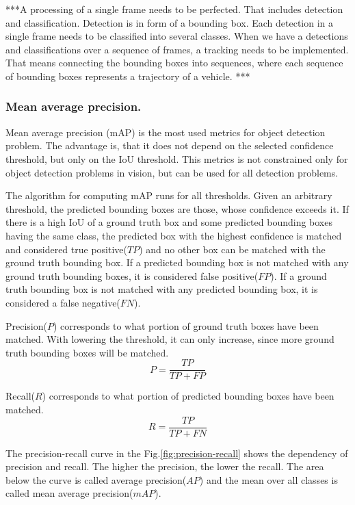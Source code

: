 \documentclass[a4paper,12pt,titlepage, twoside]{article}
\numberwithin{figure}{section}
\begin{document}
***A processing of a single frame needs to be perfected. That includes detection and classification. Detection is in form of a bounding box. Each detection in a single frame needs to be classified into several classes. When we have a detections and classifications over a sequence of frames, a tracking needs to be implemented. That means connecting the bounding boxes into sequences, where each sequence of bounding boxes represents a trajectory of a vehicle. ***



\subsubsection{Mean average precision.}
\label{sec:mAP}
Mean average precision (mAP) is the most used metrics for object detection problem. The advantage is, that it does not depend on the selected confidence threshold, but only on the IoU threshold. This metrics is not constrained only for object detection problems in vision, but can be used for all detection problems. 

The algorithm for computing mAP runs for all thresholds. Given an arbitrary threshold, the predicted bounding boxes are those, whose confidence exceeds it. If there is a high IoU of a ground truth box and some predicted bounding boxes having the same class, the predicted box with the highest confidence is matched and considered true positive($TP$) and no other box can be matched with the ground truth bounding box. If a predicted bounding box is not matched with any ground truth bounding boxes, it is considered false positive($FP$). If a ground truth bounding box is not matched with any predicted bounding box, it is considered a false negative($FN$).

Precision($P$) corresponds to what portion of ground truth boxes have been matched. With lowering the threshold, it can only increase, since more ground truth bounding boxes will be matched.
\begin{equation}
P = \frac{TP}{TP + FP}
\end{equation}

Recall($R$) corresponds to what portion of predicted bounding boxes have been matched. 
\begin{equation}
R = \frac{TP}{TP + FN}
\end{equation}

The precision-recall curve in the Fig.\ref{fig:precision-recall} shows the dependency of precision and recall. The higher the precision, the lower the recall. The area below the curve is called average precision($AP$) and the mean over all classes is called mean average precision($mAP$).
\end{document}
